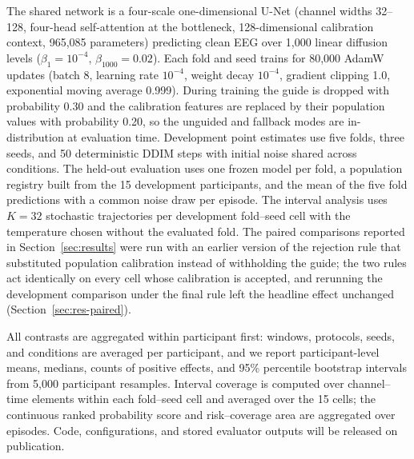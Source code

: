 The shared network is a four-scale one-dimensional U-Net (channel widths 32--128, four-head self-attention at the bottleneck, 128-dimensional calibration context, 965{,}085 parameters) predicting clean EEG over 1{,}000 linear diffusion levels ($\beta_1=10^{-4}$, $\beta_{1000}=0.02$). Each fold and seed trains for 80{,}000 AdamW updates (batch 8, learning rate $10^{-4}$, weight decay $10^{-4}$, gradient clipping 1.0, exponential moving average 0.999). During training the guide is dropped with probability 0.30 and the calibration features are replaced by their population values with probability 0.20, so the unguided and fallback modes are in-distribution at evaluation time. Development point estimates use five folds, three seeds, and 50 deterministic DDIM steps with initial noise shared across conditions. The held-out evaluation uses one frozen model per fold, a population registry built from the 15 development participants, and the mean of the five fold predictions with a common noise draw per episode. The interval analysis uses $K=32$ stochastic trajectories per development fold--seed cell with the temperature chosen without the evaluated fold. The paired comparisons reported in Section~\ref{sec:results} were run with an earlier version of the rejection rule that substituted population calibration instead of withholding the guide; the two rules act identically on every cell whose calibration is accepted, and rerunning the development comparison under the final rule left the headline effect unchanged (Section~\ref{sec:res-paired}).

All contrasts are aggregated within participant first: windows, protocols, seeds, and conditions are averaged per participant, and we report participant-level means, medians, counts of positive effects, and 95\% percentile bootstrap intervals from 5{,}000 participant resamples. Interval coverage is computed over channel--time elements within each fold--seed cell and averaged over the 15 cells; the continuous ranked probability score and risk--coverage area are aggregated over episodes. Code, configurations, and stored evaluator outputs will be released on publication.

